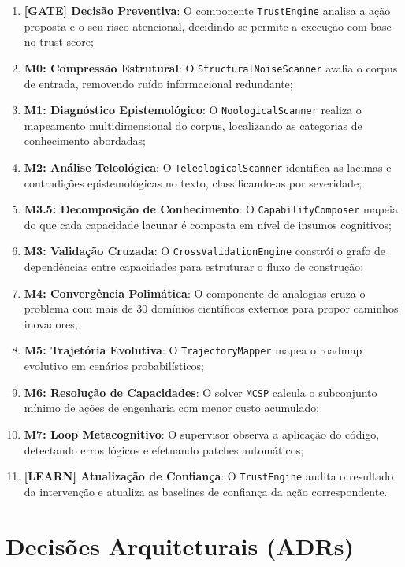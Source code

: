 \documentclass[12pt,a4paper,oneside]{abntex2}
\begin{document}
\begin{enumerate}
    \item \textbf{[GATE] Decisão Preventiva}: O componente \texttt{TrustEngine} analisa a ação proposta e o seu risco atencional, decidindo se permite a execução com base no trust score;
    \item \textbf{M0: Compressão Estrutural}: O \texttt{StructuralNoiseScanner} avalia o corpus de entrada, removendo ruído informacional redundante;
    \item \textbf{M1: Diagnóstico Epistemológico}: O \texttt{NoologicalScanner} realiza o mapeamento multidimensional do corpus, localizando as categorias de conhecimento abordadas;
    \item \textbf{M2: Análise Teleológica}: O \texttt{TeleologicalScanner} identifica as lacunas e contradições epistemológicas no texto, classificando-as por severidade;
    \item \textbf{M3.5: Decomposição de Conhecimento}: O \texttt{CapabilityComposer} mapeia do que cada capacidade lacunar é composta em nível de insumos cognitivos;
    \item \textbf{M3: Validação Cruzada}: O \texttt{CrossValidationEngine} constrói o grafo de dependências entre capacidades para estruturar o fluxo de construção;
    \item \textbf{M4: Convergência Polimática}: O componente de analogias cruza o problema com mais de 30 domínios científicos externos para propor caminhos inovadores;
    \item \textbf{M5: Trajetória Evolutiva}: O \texttt{TrajectoryMapper} mapea o roadmap evolutivo em cenários probabilísticos;
    \item \textbf{M6: Resolução de Capacidades}: O solver \texttt{MCSP} calcula o subconjunto mínimo de ações de engenharia com menor custo acumulado;
    \item \textbf{M7: Loop Metacognitivo}: O supervisor observa a aplicação do código, detectando erros lógicos e efetuando patches automáticos;
    \item \textbf{[LEARN] Atualização de Confiança}: O \texttt{TrustEngine} audita o resultado da intervenção e atualiza as baselines de confiança da ação correspondente.
\end{enumerate}

\section{Decisões Arquiteturais (ADRs)}
\end{document}
